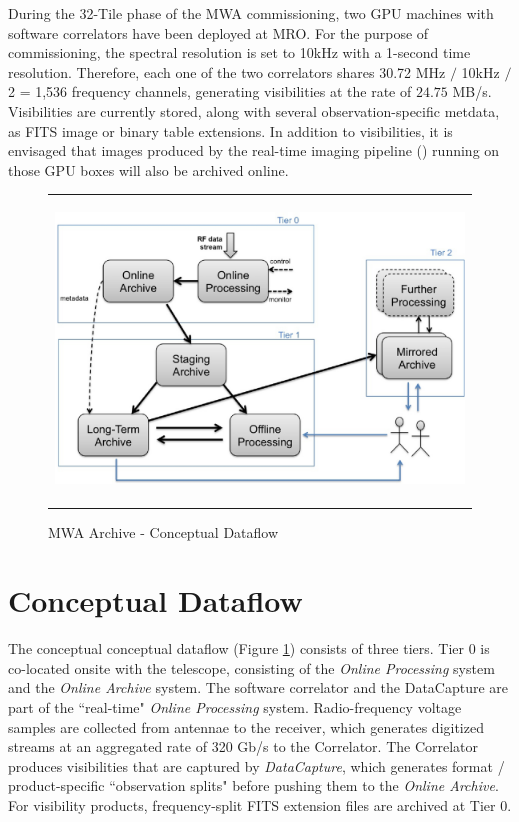 During the 32-Tile phase of the MWA commissioning, two GPU machines with software correlators have been deployed at MRO. For the purpose of commissioning, the spectral resolution is set to 10kHz with a 1-second time resolution. Therefore, each one of the two correlators shares 30.72 MHz \(/\) 10kHz \(/\) 2 = 1,536 frequency channels, generating visibilities at the rate of \(24.75\) MB/s. Visibilities are currently stored, along with several observation-specific metdata, as FITS image or binary table extensions. In addition to visibilities, it is envisaged that images produced by the real-time imaging pipeline (\cite{ord2010interferometric}) running on those GPU boxes will also be archived online.

   \begin{figure}
   \begin{center}
   \begin{tabular}{c}
   \includegraphics[height=8cm]{part6/Wu_P34/P34_f1.eps}
   \end{tabular}
   \end{center}
   \caption[example] 

   { \label{fig:con_dataflow} 
MWA Archive - Conceptual Dataflow}
   \end{figure} 

\section{Conceptual Dataflow}
The conceptual conceptual dataflow (Figure \ref{fig:con_dataflow}) consists of three tiers. Tier 0 is co-located onsite with the telescope, consisting of the \emph{Online Processing} system and the \emph{Online Archive} system. The software correlator and the DataCapture are part of the ``real-time" \emph{Online Processing} system. Radio-frequency voltage samples are collected from antennae to the receiver, which generates digitized streams at an aggregated rate of 320 Gb/s to the Correlator. The Correlator produces visibilities that are captured by \emph{DataCapture}, which generates format / product-specific ``observation splits" before pushing them to the \emph{Online Archive}. For visibility products, frequency-split FITS extension files are archived at Tier 0.

